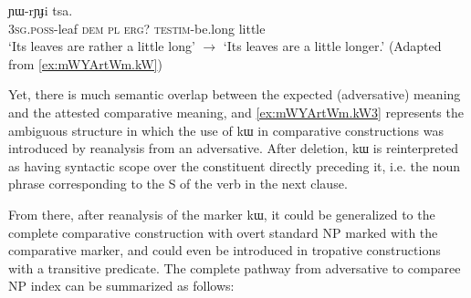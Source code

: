 \documentclass[oldfontcommands,oneside,a4paper,11pt]{article}
\newcommand{\ipa}[1]{{\phon #1}} %
\begin{document}
                      \begin{exe}
  \ex  \label{ex:mWYArtWm.kW3}  
  \gll      
[\ipa{ɯ-jwaʁ} 	\ipa{nɯ}   \ipa{ra}] 	\ipa{kɯ} 	\ipa{ɲɯ-rɲɟi} 	\ipa{tsa.} \\
\textsc{3sg.poss}-leaf \textsc{dem} \textsc{pl}   \textsc{erg?} \textsc{testim}-be.long little \\
\glt *`Its leaves are rather a little long'  $\rightarrow$  `Its leaves are a little longer.'
(Adapted from \ref{ex:mWYArtWm.kW})
          \end{exe} 
  
  
  Yet, there is much semantic overlap   between the expected (adversative) meaning and the attested comparative meaning, and \ref{ex:mWYArtWm.kW3}   represents the ambiguous structure in which the use of \ipa{kɯ} in comparative constructions was introduced by reanalysis from an adversative. After deletion, \ipa{kɯ} is reinterpreted as having syntactic scope over the constituent directly preceding it, i.e. the noun phrase corresponding to the S of the verb in the next clause.
  
  From there, after reanalysis of the marker \ipa{kɯ}, it could be generalized to the complete comparative construction with overt standard NP marked with the comparative marker, and could even be introduced in tropative constructions with a transitive predicate. The complete pathway from adversative to comparee NP index can be summarized as follows:
  
\end{document}
